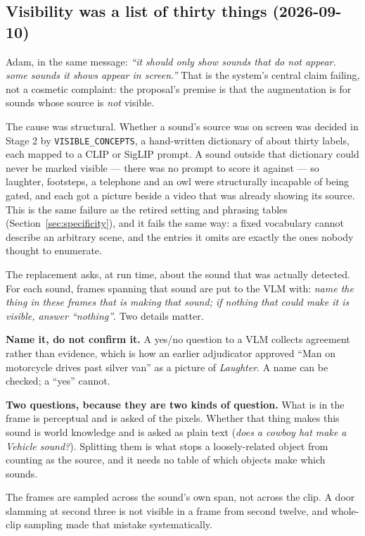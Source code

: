 \documentclass[11pt,a4paper]{article}
\begin{document}
\subsection{Visibility was a list of thirty things (2026-09-10)}\label{sec:vlmvisibility}
Adam, in the same message: \emph{``it should only show sounds that do not appear. some sounds it
shows appear in screen.''} That is the system's central claim failing, not a cosmetic complaint: the
proposal's premise is that the augmentation is for sounds whose source is \emph{not} visible.

The cause was structural. Whether a sound's source was on screen was decided in Stage 2 by
\texttt{VISIBLE\_CONCEPTS}, a hand-written dictionary of about thirty labels, each mapped to a CLIP
or SigLIP prompt. A sound outside that dictionary could never be marked visible --- there was no
prompt to score it against --- so laughter, footsteps, a telephone and an owl were structurally
incapable of being gated, and each got a picture beside a video that was already showing its source.
This is the same failure as the retired setting and phrasing tables (Section~\ref{sec:specificity}),
and it fails the same way: a fixed vocabulary cannot describe an arbitrary scene, and the entries it
omits are exactly the ones nobody thought to enumerate.

The replacement asks, at run time, about the sound that was actually detected. For each sound, frames
spanning that sound are put to the VLM with: \emph{name the thing in these frames that is making that
sound; if nothing that could make it is visible, answer ``nothing''}. Two details matter.

\textbf{Name it, do not confirm it.} A yes/no question to a VLM collects agreement rather than
evidence, which is how an earlier adjudicator approved ``Man on motorcycle drives past silver van''
as a picture of \emph{Laughter}. A name can be checked; a ``yes'' cannot.

\textbf{Two questions, because they are two kinds of question.} What is in the frame is perceptual
and is asked of the pixels. Whether that thing makes this sound is world knowledge and is asked as
plain text (\emph{does a cowboy hat make a Vehicle sound?}). Splitting them is what stops a
loosely-related object from counting as the source, and it needs no table of which objects make which
sounds.

The frames are sampled across the sound's own span, not across the clip. A door slamming at second
three is not visible in a frame from second twelve, and whole-clip sampling made that mistake
systematically.
\end{document}
